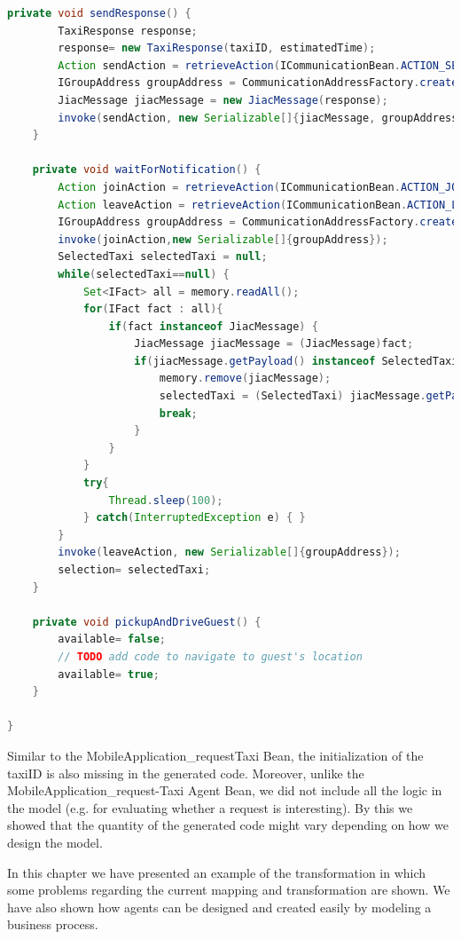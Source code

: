 \begin{lstlisting}[language=java, caption= Generated Agent Bean - ETaxi\_requestTaxi]
	private void sendResponse() {
		TaxiResponse response;
		response= new TaxiResponse(taxiID, estimatedTime);
		Action sendAction = retrieveAction(ICommunicationBean.ACTION_SEND);
		IGroupAddress groupAddress = CommunicationAddressFactory.createGroupAddress("TaxiResponseTo"+appID+"");
		JiacMessage jiacMessage = new JiacMessage(response);
		invoke(sendAction, new Serializable[]{jiacMessage, groupAddress});
	}

	private void waitForNotification() {
		Action joinAction = retrieveAction(ICommunicationBean.ACTION_JOIN_GROUP);
		Action leaveAction = retrieveAction(ICommunicationBean.ACTION_LEAVE_GROUP);
		IGroupAddress groupAddress = CommunicationAddressFactory.createGroupAddress("notification");
		invoke(joinAction,new Serializable[]{groupAddress});
		SelectedTaxi selectedTaxi = null;
		while(selectedTaxi==null) {
			Set<IFact> all = memory.readAll();
			for(IFact fact : all){
				if(fact instanceof JiacMessage) {
					JiacMessage jiacMessage = (JiacMessage)fact;
					if(jiacMessage.getPayload() instanceof SelectedTaxi && jiacMessage.getHeader(IJiacMessage.Header.SEND_TO).equals("notification")) {
						memory.remove(jiacMessage);
						selectedTaxi = (SelectedTaxi) jiacMessage.getPayload();
						break;
					}
				}
			}
			try{
				Thread.sleep(100);
			} catch(InterruptedException e) { }
		}
		invoke(leaveAction, new Serializable[]{groupAddress});
		selection= selectedTaxi;
	}

	private void pickupAndDriveGuest() {
		available= false;
		// TODO add code to navigate to guest's location
		available= true;
	}
	
}
\end{lstlisting}

Similar to the MobileApplication\_requestTaxi Bean, the initialization of the taxiID is also missing in the generated code. Moreover, unlike the MobileApplication\_request-Taxi Agent Bean, we did not include all the logic in the model (e.g. for evaluating whether a request is interesting). By this we showed that the quantity of the generated code might vary depending on how we design the model.


In this chapter we have presented an example of the transformation in which some problems regarding the current mapping and transformation are shown. We have also shown how agents can be designed and created easily by modeling a business process. 

